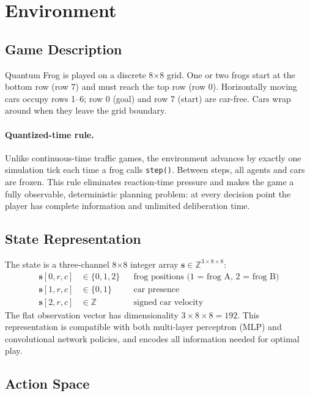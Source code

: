 \documentclass[12pt]{article}
\begin{document}
\section{Environment}
\label{sec:env}

\subsection{Game Description}

Quantum Frog is played on a discrete 8$\times$8 grid.  One or two frogs
start at the bottom row (row 7) and must reach the top row (row 0).
Horizontally moving cars occupy rows 1--6; row 0 (goal) and row 7 (start)
are car-free.  Cars wrap around when they leave the grid boundary.

\paragraph{Quantized-time rule.}
Unlike continuous-time traffic games, the environment advances by exactly one
simulation tick each time a frog calls \texttt{step()}.  Between steps, all
agents and cars are frozen.  This rule eliminates reaction-time pressure and
makes the game a fully observable, deterministic planning problem: at every
decision point the player has complete information and unlimited deliberation
time.

\subsection{State Representation}

The state is a three-channel 8$\times$8 integer array $\mathbf{s} \in
\mathbb{Z}^{3 \times 8 \times 8}$:
\begin{align*}
  \mathbf{s}[0, r, c] &\in \{0, 1, 2\} && \text{frog positions
    (1 = frog A, 2 = frog B)} \\
  \mathbf{s}[1, r, c] &\in \{0, 1\}   && \text{car presence} \\
  \mathbf{s}[2, r, c] &\in \mathbb{Z}  && \text{signed car velocity}
\end{align*}
The flat observation vector has dimensionality $3 \times 8 \times 8 = 192$.
This representation is compatible with both multi-layer perceptron (MLP) and
convolutional network policies, and encodes all information needed for optimal
play.

\subsection{Action Space}
\end{document}
